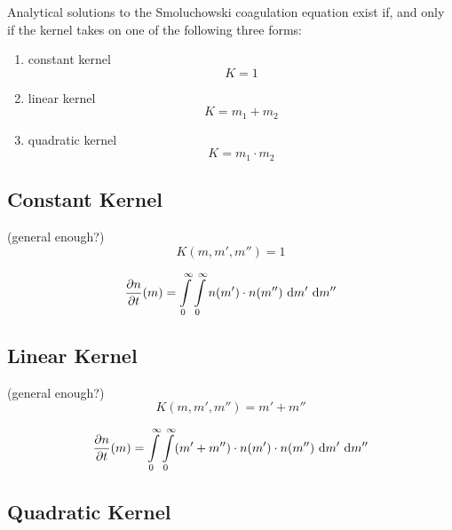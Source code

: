     Analytical solutions to the Smoluchowski coagulation equation exist if, and only if the kernel
    takes on one of the following three forms:
    \begin{enumerate}
        \item constant kernel
            $$K=1$$
        \item linear kernel
            $$K=m_1+m_2$$
        \item quadratic kernel
            $$K=m_1\cdot m_2$$
    \end{enumerate}

    \subsection{Constant Kernel}

     (general enough?)
    \begin{equation}
        K(m, m', m'')
            = 1
    \end{equation}

    \begin{equation}
        \frac{\partial n}{\partial t}(m)
            = 
                \int\limits_0^\infty \int\limits_0^\infty
                n(m') \cdot n(m'')
                \ \text{d} m' \ \text{d} m''
    \end{equation}

    \subsection{Linear Kernel}

     (general enough?)
    \begin{equation}
        K(m, m', m'')
            = m' + m''
    \end{equation}

    \begin{equation}
        \frac{\partial n}{\partial t}(m)
            = 
                \int\limits_0^\infty \int\limits_0^\infty
                (m' + m'') \cdot
                n(m') \cdot n(m'')
                \ \text{d} m' \ \text{d} m''
    \end{equation}

    \subsection{Quadratic Kernel}

